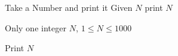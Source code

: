 Take a Number and print it
Given $N$ print $N$

Only one integer $N$, $1 \le N \le 1000$

Print $N$






